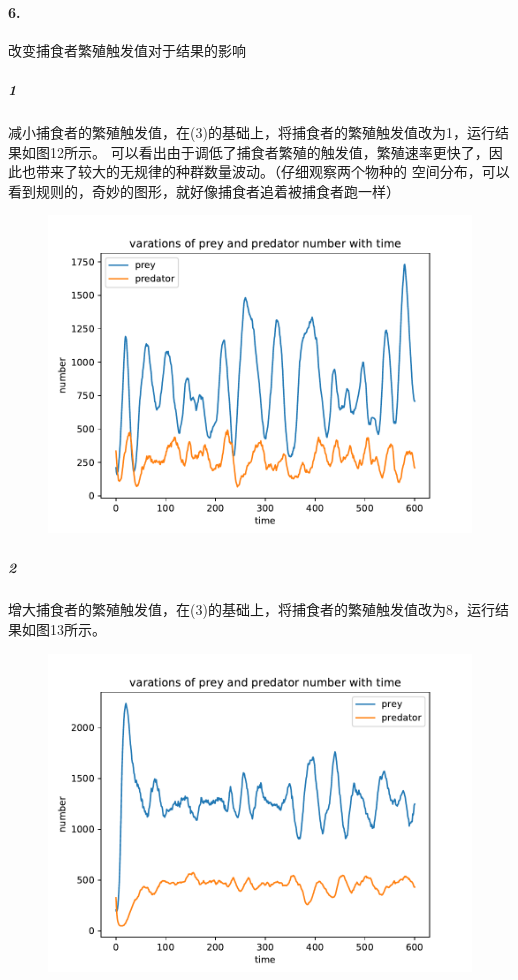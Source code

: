 \documentclass[a4paper]{ctexart}
\begin{document}
	\paragraph{6.}改变捕食者繁殖触发值对于结果的影响
	\subparagraph{1}减小捕食者的繁殖触发值，在(3)的基础上，将捕食者的繁殖触发值改为1，运行结果如图12所示。
	可以看出由于调低了捕食者繁殖的触发值，繁殖速率更快了，因此也带来了较大的无规律的种群数量波动。（仔细观察两个物种的
	空间分布，可以看到规则的，奇妙的图形，就好像捕食者追着被捕食者跑一样）
	\begin{figure}[htbp]
		\centering
		\includegraphics[scale=0.6]{demo11.pdf}
		\caption{}
	\end{figure}
	\subparagraph{2}增大捕食者的繁殖触发值，在(3)的基础上，将捕食者的繁殖触发值改为8，运行结果如图13所示。
	\begin{figure}[htbp]
		\centering 
		\includegraphics[scale=0.6]{demo12.pdf}
		\caption{}
	\end{figure}\\
	\\
\end{document}
